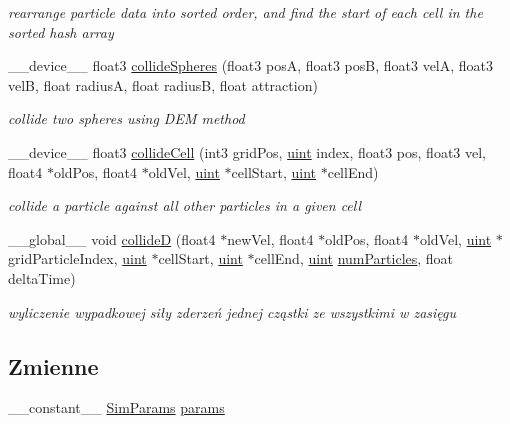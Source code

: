 \begin{DoxyCompactItemize}
\begin{DoxyCompactList}\small\item\em rearrange particle data into sorted order, and find the start of each cell in the sorted hash array \end{DoxyCompactList}\item 
\-\_\-\-\_\-device\-\_\-\-\_\- float3 \hyperlink{particles__kernel__impl_8cuh_a1d93cb067b16b4a472e9c1a08d9d8e68}{collide\-Spheres} (float3 pos\-A, float3 pos\-B, float3 vel\-A, float3 vel\-B, float radius\-A, float radius\-B, float attraction)
\begin{DoxyCompactList}\small\item\em collide two spheres using D\-E\-M method \end{DoxyCompactList}\item 
\-\_\-\-\_\-device\-\_\-\-\_\- float3 \hyperlink{particles__kernel__impl_8cuh_a8e623e11d4ac873cfbe9d7c916326363}{collide\-Cell} (int3 grid\-Pos, \hyperlink{particles__kernel_8cuh_a91ad9478d81a7aaf2593e8d9c3d06a14}{uint} index, float3 pos, float3 vel, float4 $\ast$old\-Pos, float4 $\ast$old\-Vel, \hyperlink{particles__kernel_8cuh_a91ad9478d81a7aaf2593e8d9c3d06a14}{uint} $\ast$cell\-Start, \hyperlink{particles__kernel_8cuh_a91ad9478d81a7aaf2593e8d9c3d06a14}{uint} $\ast$cell\-End)
\begin{DoxyCompactList}\small\item\em collide a particle against all other particles in a given cell \end{DoxyCompactList}\item 
\-\_\-\-\_\-global\-\_\-\-\_\- void \hyperlink{particles__kernel__impl_8cuh_a295ed0293da0aab40ac5d904c319abdf}{collide\-D} (float4 $\ast$new\-Vel, float4 $\ast$old\-Pos, float4 $\ast$old\-Vel, \hyperlink{particles__kernel_8cuh_a91ad9478d81a7aaf2593e8d9c3d06a14}{uint} $\ast$grid\-Particle\-Index, \hyperlink{particles__kernel_8cuh_a91ad9478d81a7aaf2593e8d9c3d06a14}{uint} $\ast$cell\-Start, \hyperlink{particles__kernel_8cuh_a91ad9478d81a7aaf2593e8d9c3d06a14}{uint} $\ast$cell\-End, \hyperlink{particles__kernel_8cuh_a91ad9478d81a7aaf2593e8d9c3d06a14}{uint} \hyperlink{particles_8cpp_a05b8a90212054a3eb1a036ae0c269596}{num\-Particles}, float delta\-Time)
\begin{DoxyCompactList}\small\item\em wyliczenie wypadkowej siły zderzeń jednej cząstki ze wszystkimi w zasięgu \end{DoxyCompactList}\end{DoxyCompactItemize}
\subsection*{Zmienne}
\begin{DoxyCompactItemize}
\item 
\-\_\-\-\_\-constant\-\_\-\-\_\- \hyperlink{struct_sim_params}{Sim\-Params} \hyperlink{particles__kernel__impl_8cuh_a8db8938e28edd17862daf58651051bdc}{params}
\end{DoxyCompactItemize}


